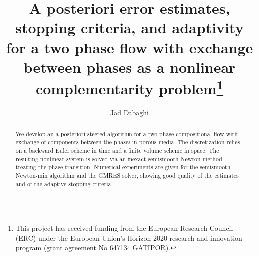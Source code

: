 \documentclass[10pt,a4paper]{article}
\numberwithin{equation}{section}
\begin{document}
\thispagestyle{empty}
\setcounter{page}{1}






\title{{A posteriori error estimates, stopping criteria, and adaptivity for a two phase flow with exchange between phases as a nonlinear complementarity problem\thanks{This
project has received funding from the European Research Council (ERC)
under the European Union's Horizon 2020 research and innovation program
(grant agreement
No 647134 GATIPOR).}}}
\author{\underline{Jad Dabaghi} 
}

\maketitle


\begin{abstract}
\label{ref:abstract}
We develop an a posteriori-steered algorithm for a two-phase compositional flow with exchange of components between the phases in porous media. The discretization relies on a backward Euler scheme in time and a finite volume scheme in space. The resulting nonlinear system is solved via an inexact semismooth Newton method treating the phase transition. Numerical experiments are given for the semismooth Newton-min algorithm and the GMRES solver, showing good quality of the  estimates and of the adaptive stopping criteria.
\end{abstract}
\end{document}
